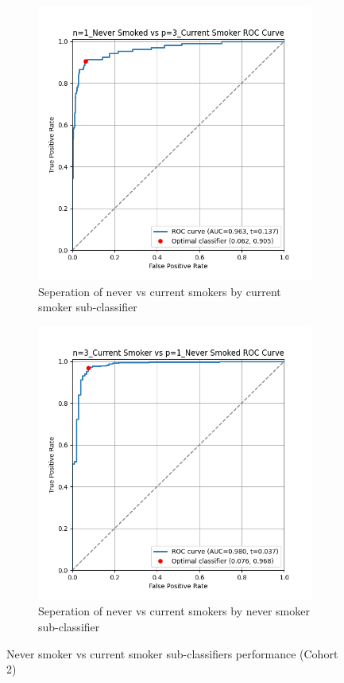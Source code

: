\documentclass{article}
\begin{document}
\begin{figure}
    \begin{subfigure}{0.48\textwidth}
        \centering
        \includegraphics[width=\linewidth]{cohort2_1v3_roc.png}
        \caption{Seperation of never vs current smokers by current smoker sub-classifier}
    \end{subfigure}
    \hfill
    \begin{subfigure}{0.48\textwidth}
        \centering
        \includegraphics[width=\linewidth]{cohort2_3v1_roc.png}
        \caption{Seperation of never vs current smokers by never smoker sub-classifier}
    \end{subfigure}
    \caption{Never smoker vs current smoker sub-classifiers performance (Cohort 2)}
\end{figure}
\end{document}
